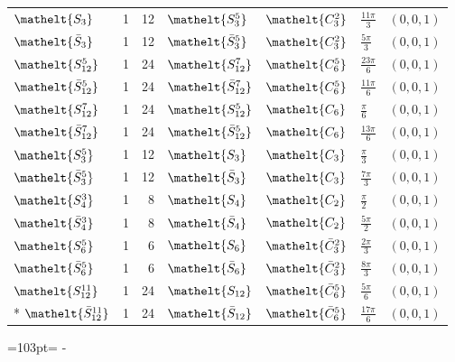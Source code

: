 \documentclass[10pt,a4paper]{article}
\newcommand{\needspace}[1]{\par\penalty-100\begingroup\dimen0=#1\relax\dimen2=\pagegoal
  \advance\dimen2-\pagetotal\ifdim\dimen0>\dimen2\relax\ifdim\dimen2>0pt\vfil\break\fi\fi
  \endgroup}
\numberwithin{equation}{section}
\newcommand{\eltfont}[1]{{\let\sigma\eltsigma\mathelt{#1}}}
\newcommand{\cls}[1]{\eltfont{#1}}
\newcommand{\dirvec}[3]{(#1, #2, #3)}
\newcommand{\barred}[1]{\bar{#1}}
\begin{document}
{\begin{longtable}{@{}lrrllll@{}}
$\cls{S_{3}}$ & 1 & 12 & $\cls{S_{3}^{5}}$ & $\cls{C_{3}^{2}}$ & $\tfrac{11\pi}{3}$ & $\dirvec{0}{0}{1}$\\
$\cls{\barred{S}_{3}}$ & 1 & 12 & $\cls{\barred{S}_{3}^{5}}$ & $\cls{C_{3}^{2}}$ & $\tfrac{5\pi}{3}$ & $\dirvec{0}{0}{1}$\\
$\cls{S_{12}^{5}}$ & 1 & 24 & $\cls{S_{12}^{7}}$ & $\cls{C_{6}^{5}}$ & $\tfrac{23\pi}{6}$ & $\dirvec{0}{0}{1}$\\
$\cls{\barred{S}_{12}^{5}}$ & 1 & 24 & $\cls{\barred{S}_{12}^{7}}$ & $\cls{C_{6}^{5}}$ & $\tfrac{11\pi}{6}$ & $\dirvec{0}{0}{1}$\\
$\cls{S_{12}^{7}}$ & 1 & 24 & $\cls{S_{12}^{5}}$ & $\cls{C_{6}}$ & $\tfrac{\pi}{6}$ & $\dirvec{0}{0}{1}$\\
$\cls{\barred{S}_{12}^{7}}$ & 1 & 24 & $\cls{\barred{S}_{12}^{5}}$ & $\cls{C_{6}}$ & $\tfrac{13\pi}{6}$ & $\dirvec{0}{0}{1}$\\
$\cls{S_{3}^{5}}$ & 1 & 12 & $\cls{S_{3}}$ & $\cls{C_{3}}$ & $\tfrac{\pi}{3}$ & $\dirvec{0}{0}{1}$\\
$\cls{\barred{S}_{3}^{5}}$ & 1 & 12 & $\cls{\barred{S}_{3}}$ & $\cls{C_{3}}$ & $\tfrac{7\pi}{3}$ & $\dirvec{0}{0}{1}$\\
$\cls{S_{4}^{3}}$ & 1 & 8 & $\cls{S_{4}}$ & $\cls{C_{2}}$ & $\tfrac{\pi}{2}$ & $\dirvec{0}{0}{1}$\\
$\cls{\barred{S}_{4}^{3}}$ & 1 & 8 & $\cls{\barred{S}_{4}}$ & $\cls{C_{2}}$ & $\tfrac{5\pi}{2}$ & $\dirvec{0}{0}{1}$\\
$\cls{S_{6}^{5}}$ & 1 & 6 & $\cls{S_{6}}$ & $\cls{\barred{C}_{3}^{2}}$ & $\tfrac{2\pi}{3}$ & $\dirvec{0}{0}{1}$\\
$\cls{\barred{S}_{6}^{5}}$ & 1 & 6 & $\cls{\barred{S}_{6}}$ & $\cls{\barred{C}_{3}^{2}}$ & $\tfrac{8\pi}{3}$ & $\dirvec{0}{0}{1}$\\
$\cls{S_{12}^{11}}$ & 1 & 24 & $\cls{S_{12}}$ & $\cls{\barred{C}_{6}^{5}}$ & $\tfrac{5\pi}{6}$ & $\dirvec{0}{0}{1}$\\*
$\cls{\barred{S}_{12}^{11}}$ & 1 & 24 & $\cls{\barred{S}_{12}}$ & $\cls{\barred{C}_{6}^{5}}$ & $\tfrac{17\pi}{6}$ & $\dirvec{0}{0}{1}$\\
\bottomrule\end{longtable}}
\needspace{103pt}
\end{document}
